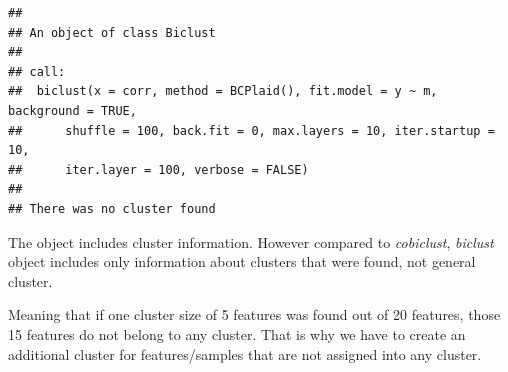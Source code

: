 \documentclass[
]{book}
\begin{document}
\begin{verbatim}
## 
## An object of class Biclust 
## 
## call:
##  biclust(x = corr, method = BCPlaid(), fit.model = y ~ m, background = TRUE, 
##      shuffle = 100, back.fit = 0, max.layers = 10, iter.startup = 10, 
##      iter.layer = 100, verbose = FALSE)
## 
## There was no cluster found
\end{verbatim}

The object includes cluster information. However compared to
\emph{cobiclust}, \emph{biclust} object includes only information about clusters
that were found, not general cluster.

Meaning that if one cluster size of 5 features was found out of 20 features,
those 15 features do not belong to any cluster. That is why we have to create an
additional cluster for features/samples that are not assigned into any cluster.
\end{document}

